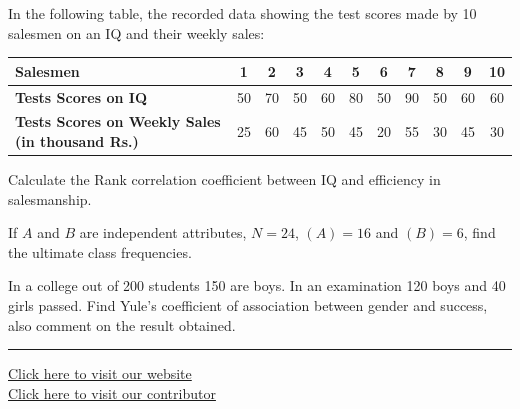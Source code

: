 \documentclass[11pt,a4paper]{article}
\begin{document}
\begin{parts}
  \item In the following table, the recorded data showing the test scores made by 10 salesmen on an IQ and their weekly sales:
  
\begin{center}
  \small
  
\begin{tabular}{|l|c|c|c|c|c|c|c|c|c|c|}
    \hline
   \textbf{Salesmen} & 1 & 2 & 3 & 4 & 5 & 6 & 7 & 8 & 9 & 10 \\ \hline
   \textbf{Tests Scores on IQ} & 50 & 70 & 50 & 60 & 80 & 50 & 90 & 50 & 60 & 60 \\ \hline
   \textbf{Tests Scores on Weekly Sales (in thousand Rs.)} & 25 & 60 & 45 & 50 & 45 & 20 & 55 & 30 & 45 & 30 \\ \hline
  \end{tabular}
  \end{center}
  Calculate the Rank correlation coefficient between IQ and efficiency in salesmanship.

  \item If $A$ and $B$ are independent attributes, $N = 24$, $(A) = 16$ and $(B) = 6$, find the ultimate class frequencies.

  \item In a college out of 200 students 150 are boys. In an examination 120 boys and 40 girls passed. Find Yule's coefficient of association between gender and success, also comment on the result obtained.
\end{parts}

\vfill
\rule{\linewidth}{0.4pt}

\begin{center}\small
\href{https://bhu-exam.vercel.app/}{Click here to visit our website}\\[4pt]
\href{https://me-aryan.vercel.app/}{Click here to visit our contributor}
\end{center}
\end{document}
